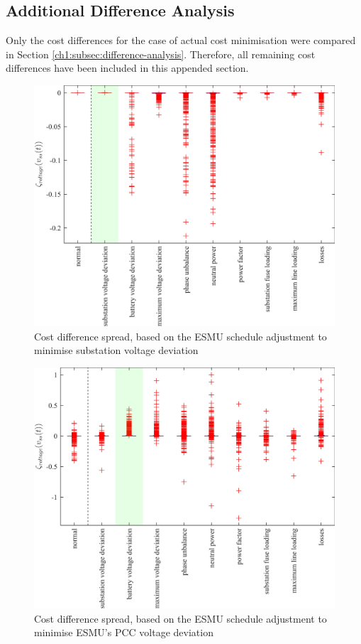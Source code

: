 \subsection{Additional Difference Analysis}
\label{appx-a:ch1:additional-difference-analysis}

Only the cost differences for the case of actual cost minimisation were compared in Section \ref{ch1:subsec:difference-analysis}.
Therefore, all remaining cost differences have been included in this appended section.

\begin{figure}\centering
	\includegraphics{_chapter1/fig/appendix/minimising-substation-voltage-deviation}
	\caption{Cost difference spread, based on the ESMU schedule adjustment to minimise substation voltage deviation}
\end{figure}

\begin{figure}\centering
	\includegraphics{_chapter1/fig/appendix/minimising-battery-voltage-deviation}
	\caption{Cost difference spread, based on the ESMU schedule adjustment to minimise ESMU's PCC voltage deviation}
\end{figure}

